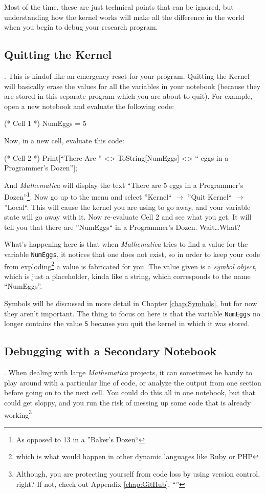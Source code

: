 Most of the time, these are just technical points that can be ignored, but understanding how the kernel works will make all the difference in the world when you begin to debug your research program.

\subsection{Quitting the Kernel}. This is kindof like an emergency reset for your program. Quitting the Kernel will basically erase the values for all the variables in your notebook (because they are stored in this separate program which you are about to quit). For example, open a new notebook and evaluate the following code:

\begin{code}
	   (* Cell 1 *)
	   NumEggs = 5
\end{code}

Now, in a new cell, evaluate this code:

\begin{code}
	(* Cell 2 *)
	Print[``There Are '' <> ToString[NumEggs] <> `` eggs in a Programmer's Dozen''];
\end{code}

And \emph{Mathematica} will display the text ``There are 5 eggs in a Programmer's Dozen''\footnote{As opposed to 13 in a ''Baker's Dozen``}. Now go up to the menu and select ''Kernel`` $\rightarrow$ ''Quit Kernel`` $\rightarrow$ ''Local``. This will cause the kernel you are using to go away, and your variable state will go away with it. Now re-evaluate Cell 2 and see what you get. It will tell you that there are ''NumEggs`` in a Programmer's Dozen. Wait\ldots What?

What's happening here is that when \emph{Mathematica} tries to find a value for the variable \texttt{NumEggs}, it notices that one does not exist, so in order to keep your code from exploding\footnote{which is what would happen in other dynamic languages like Ruby or PHP} a value is fabricated for you. The value given is a \emph{symbol object}, which is just a placeholder, kinda like a string, which corresponds to the name ``NumEggs''.

Symbols will be discussed in more detail in Chapter \ref{chap:Symbols}, but for now they aren't important. The thing to focus on here is that the variable \texttt{NumEggs} no longer contains the value \texttt{5} because you quit the kernel in which it was stored.

\subsection{Debugging with a Secondary Notebook}. When dealing with large \emph{Mathematica} projects, it can sometimes be handy to play around with a particular line of code, or analyze the output from one section before going on to the next cell. You could do this all in one notebook, but that could get sloppy, and you run the risk of messing up some code that is already working\footnote{Although, you are protecting yourself from code loss by using version control, right? If not, check out Appendix \ref{chap:GitHub}, ``''}
